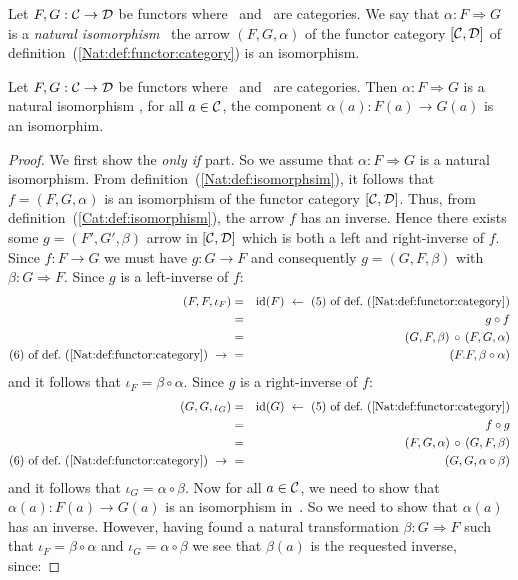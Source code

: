 \begin{defin}\label{Nat:def:isomorphsim}
    Let $F,G:\mbox{$\cal C$}\to\mbox{$\cal D$}$ be functors where \Cat\ and \Dat\ are categories.
    We say that $\alpha:F\Rightarrow G$ is a {\em natural isomorphism} 
    \ifand\ the arrow $(F,G,\alpha)$ of the functor category
    $[\mbox{$\cal C$},\mbox{$\cal D$}]$ of definition~(\ref{Nat:def:functor:category}) 
    is an isomorphism.
\end{defin}

\begin{prop}\label{Nat:prop:isomorphism}
    Let $F,G:\mbox{$\cal C$}\to\mbox{$\cal D$}$ be functors where \Cat\ and \Dat\ are categories.
    Then $\alpha:F\Rightarrow G$ is a natural isomorphism \ifand, for
    all $a\in\mbox{$\cal C$}$, the component $\alpha(a):F(a)\to G(a)$ is an
    isomorphim.
\end{prop}
\begin{proof}
    We first show the {\em only if} part. So we assume that 
    $\alpha:F\Rightarrow G$ is a natural isomorphism. From 
    definition~(\ref{Nat:def:isomorphsim}), it follows that
    $f=(F,G,\alpha)$ is an isomorphism of the functor category
    $[\mbox{$\cal C$},\mbox{$\cal D$}]$. Thus, from definition~(\ref{Cat:def:isomorphism}), 
    the arrow $f$ has an inverse. Hence there exists some
    $g=(F',G',\beta)$ arrow in $[\mbox{$\cal C$},\mbox{$\cal D$}]$ which is both a left and
    right-inverse of $f$. Since $f:F\to G$ we must have $g:G\to F$ and
    consequently $g=(G,F,\beta)$ with $\beta:G\Rightarrow F$. Since $g$ 
    is a left-inverse of $f$: 
        \begin{eqnarray*}(F,F,\iota_{F})
            &=&\id(F)\ \leftarrow\ 
            \mbox{$(5)$ of def.~(\ref{Nat:def:functor:category})}\\
            &=&g\circ f\\
            &=&(G,F,\beta)\,\circ\,(F,G,\alpha)\\
            \mbox{$(6)$ of def.~(\ref{Nat:def:functor:category})}\ \to\ 
            &=&(F.F,\beta\circ\alpha)
        \end{eqnarray*}
    and it follows that $\iota_{F}=\beta\circ\alpha$. Since $g$ is
    a right-inverse of $f$:
        \begin{eqnarray*}(G,G,\iota_{G})
            &=&\id(G)\ \leftarrow\ 
            \mbox{$(5)$ of def.~(\ref{Nat:def:functor:category})}\\
            &=&f\circ g\\
            &=&(F,G,\alpha)\,\circ\,(G,F,\beta)\\
            \mbox{$(6)$ of def.~(\ref{Nat:def:functor:category})}\ \to\ 
            &=&(G,G,\alpha\circ\beta)
        \end{eqnarray*}
    and it follows that $\iota_{G}=\alpha\circ\beta$. Now for all $a\in\mbox{$\cal C$}$,
    we need to show that $\alpha(a):F(a)\to G(a)$ is an isomorphism in~\Dat.
    So we need to show that $\alpha(a)$ has an inverse. However, having found
    a natural transformation $\beta : G\Rightarrow F$ such that 
    $\iota_{F}=\beta\circ\alpha$ and $\iota_{G}=\alpha\circ\beta$ we see that
    $\beta(a)$ is the requested inverse, since:
\end{proof}
